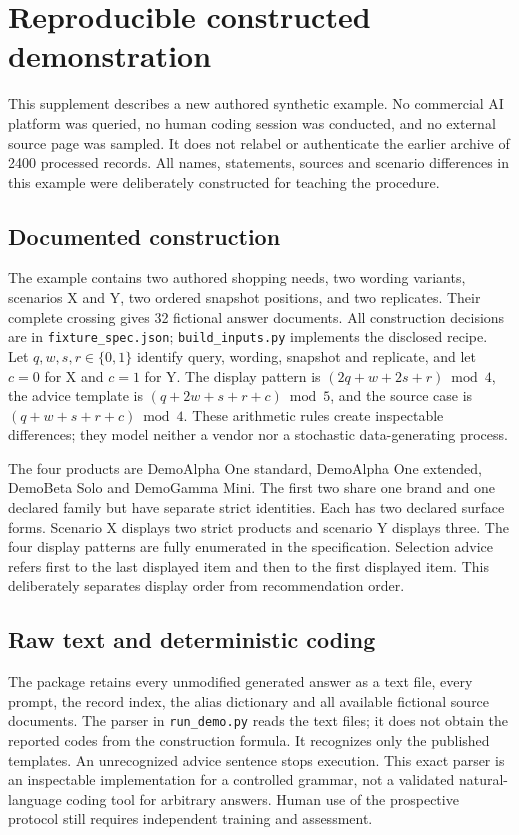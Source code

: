 \section{Reproducible constructed demonstration}
\label{sec:demo_supplement}
This supplement describes a new authored synthetic example. No commercial AI platform was queried, no human coding session was conducted, and no external source page was sampled. It does not relabel or authenticate the earlier archive of 2400 processed records. All names, statements, sources and scenario differences in this example were deliberately constructed for teaching the procedure.

\subsection{Documented construction}
The example contains two authored shopping needs, two wording variants, scenarios X and Y, two ordered snapshot positions, and two replicates. Their complete crossing gives 32 fictional answer documents. All construction decisions are in \texttt{fixture\_spec.json}; \texttt{build\_inputs.py} implements the disclosed recipe. Let $q,w,s,r\in\{0,1\}$ identify query, wording, snapshot and replicate, and let $c=0$ for X and $c=1$ for Y. The display pattern is $(2q+w+2s+r)\bmod 4$, the advice template is $(q+2w+s+r+c)\bmod 5$, and the source case is $(q+w+s+r+c)\bmod 4$. These arithmetic rules create inspectable differences; they model neither a vendor nor a stochastic data-generating process.

The four products are DemoAlpha One standard, DemoAlpha One extended, DemoBeta Solo and DemoGamma Mini. The first two share one brand and one declared family but have separate strict identities. Each has two declared surface forms. Scenario X displays two strict products and scenario Y displays three. The four display patterns are fully enumerated in the specification. Selection advice refers first to the last displayed item and then to the first displayed item. This deliberately separates display order from recommendation order.

\subsection{Raw text and deterministic coding}
The package retains every unmodified generated answer as a text file, every prompt, the record index, the alias dictionary and all available fictional source documents. The parser in \texttt{run\_demo.py} reads the text files; it does not obtain the reported codes from the construction formula. It recognizes only the published templates. An unrecognized advice sentence stops execution. This exact parser is an inspectable implementation for a controlled grammar, not a validated natural-language coding tool for arbitrary answers. Human use of the prospective protocol still requires independent training and assessment.

